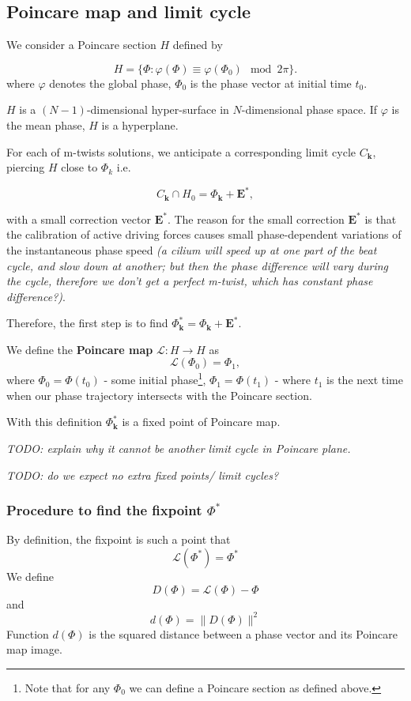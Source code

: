 \documentclass[a4paper,12pt]{article}
\renewcommand*{\vec}[1]{\mathbf{#1}}
\begin{document}
\subsection{Poincare map and limit cycle}
We consider a Poincare section $H$ defined by

$$
H =\{ \Phi : \varphi(\Phi) \equiv \varphi(\Phi_0) \mod 2\pi \}.
$$
where $\varphi$ denotes the global phase, $\Phi_0$ is the phase vector at initial time $t_0$. 

 $H$ is a $(N-1)$-dimensional hyper-surface in $N$-dimensional phase space. If $\varphi$ is the mean phase, $H$ is a hyperplane.

For each of m-twists solutions, we anticipate a corresponding limit cycle $C_\vec{k}$, piercing $H$ close to $\Phi_k$ i.e.

$$
C_\vec{k} \cap H_0 = \Phi_\vec{k} + \mathbf{E}^*,
$$

with a small correction vector $\mathbf{E}^*$.
The reason for the small correction $\mathbf{E}^*$ is that the calibration of active driving forces causes small phase-dependent variations of the instantaneous phase speed \textit{(a cilium will speed up at one part of the beat cycle, and slow down at another; but then the phase difference will vary during the cycle, therefore we don't get a perfect m-twist, which has constant phase difference?)}.

Therefore, the first step is to find $\Phi^*_\vec{k}=\Phi_\vec{k} + \mathbf{E}^*$.

We define the \textbf{Poincare map} $\mathcal{L}: H \rightarrow H$ as
 $$\mathcal{L}(\Phi_0) = \Phi_1,$$
where
$\Phi_0 = \Phi(t_0)$ - some initial phase\footnote{Note that for any $\Phi_0$ we can define a Poincare section as defined above.},
$\Phi_1=\Phi(t_1)$ - where $t_1$ is the next time when our phase trajectory intersects with the Poincare section.

With this definition  $\Phi^*_\vec{k}$ is a fixed point of Poincare map.

\textit{TODO: explain why it cannot be another limit cycle in Poincare plane. }

\textit{TODO: do we expect no extra fixed points/ limit cycles?}

\subsubsection{Procedure to find the fixpoint $\Phi^*$}

By definition, the fixpoint is such a point that
$$
\mathcal{L}(\Phi^*) = \Phi^*
$$
We define
$$
D(\Phi) = \mathcal{L}(\Phi) - \Phi
$$
and
$$
d(\Phi) = \lVert D(\Phi) \rVert ^ 2
$$
Function $d(\Phi)$ is the squared distance between a phase vector and its Poincare map image.
\end{document}
